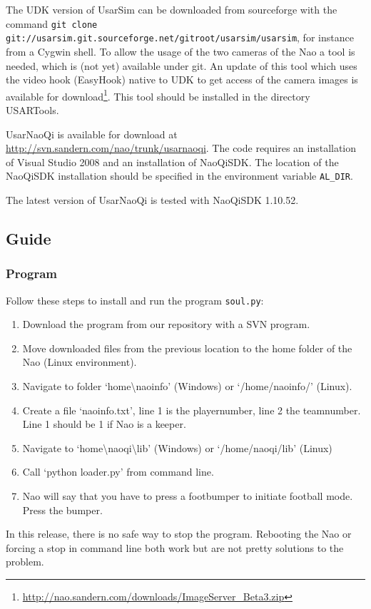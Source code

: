 \documentclass[11pt,a4paper,oneside]{article}
\begin{document}
The UDK version of UsarSim can be downloaded from sourceforge with the command \texttt{git clone git://usarsim.git.sourceforge.net/gitroot/usarsim/usarsim}, for instance from a Cygwin shell. To allow the usage of the two cameras of the Nao a tool is needed, which is (not yet) available
under git. An update of this tool which uses the video hook (EasyHook) native to UDK to get access of the camera images is available for download\footnote{\url{http://nao.sandern.com/downloads/ImageServer_Beta3.zip}}. This tool should be installed in the directory USARTools.

UsarNaoQi is available for download at \url{http://svn.sandern.com/nao/trunk/usarnaoqi}. The code requires an installation of Visual Studio 2008 and an installation of NaoQiSDK. The location of the NaoQiSDK installation should be specified in the environment variable \texttt{AL\_DIR}.

The latest version of UsarNaoQi is tested with NaoQiSDK 1.10.52.

\subsection{Guide}
\subsubsection{Program}
Follow these steps to install and run the program \texttt{soul.py}:
\begin{enumerate}
\item Download the program from our repository with a SVN program.
\item Move downloaded files from the previous location to the home folder of the Nao (Linux environment).
\item Navigate to folder `home\textbackslash naoinfo' (Windows) or `/home/naoinfo/' (Linux). 
\item Create a file `naoinfo.txt', line 1 is the playernumber, line 2 the teamnumber. Line 1 should be 1 if Nao is a keeper.
\item Navigate to `home\textbackslash naoqi\textbackslash lib' (Windows) or `/home/naoqi/lib' (Linux)
\item Call `python loader.py' from command line.
\item Nao will say that you have to press a footbumper to initiate football mode. Press the bumper.
\end{enumerate}
In this release, there is no safe way to stop the program. Rebooting the Nao or forcing a stop in command line both work but are not pretty solutions to the problem.
\end{document}
